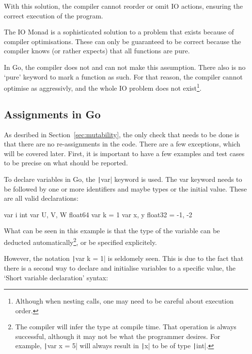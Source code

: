 With this solution, the compiler cannot reorder or omit IO actions, ensuring
the correct execution of the program.

The IO Monad is a sophisticated solution to a problem that exists because of
compiler optimisations. These can only be guaranteed to be correct because
the compiler knows (or rather expects) that all functions are pure.

In Go, the compiler does not and can not make this assumption. There also
is no `pure' keyword to mark a function as such. For that reason, the
compiler cannot optimise as aggressivly, and the whole IO problem does
not exist\footnote{Although when nesting calls, one may need to be careful about
execution order.}.

\subsection{Assignments in Go}

As desribed in Section~\ref{sec:mutability}, the only check that needs
to be done is that there are no re-assignments in the code. There are a few
exceptions, which will be covered later. First, it is important to have
a few examples and test cases to be precise on what should be reported.

To declare variables in Go, the \texttt|var| keyword is used.
The var keyword needs to be followed by one or more identifiers and maybe
types or the initial value. These are all valid declarations:

\begin{code}
    \begin{gocode}
var i int
var U, V, W float64
var k = 1
var x, y float32 = -1, -2
    \end{gocode}
\end{code}
What can be seen in this example is that the type of the variable can be
deducted automatically\footnote{The compiler will infer the type at compile
    time. That operation is always successful, although it may not be what
    the programmer desires. For example, \texttt|var x = 5| will
always result in \texttt|x| to be of type \texttt|int|.},
or be specified explicitely.

However, the notation \texttt|var k = 1| is seldomely seen. This
is due to the fact that there is a second way to declare and initialise
variables to a specific value, the `Short variable declaration' syntax:

